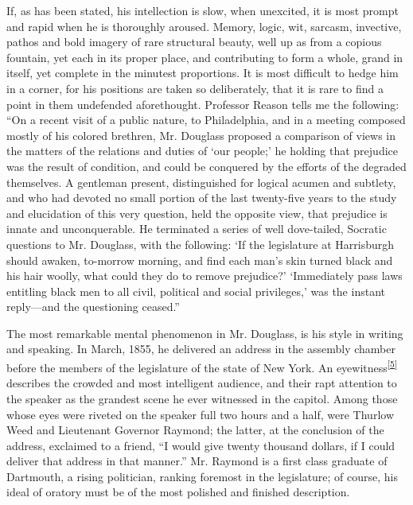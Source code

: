 If, as has been stated, his intellection is slow, when unexcited, it is
most prompt and rapid when he is thoroughly aroused. Memory, logic, wit,
sarcasm, invective, pathos and bold imagery of rare structural beauty,
well up as from a copious fountain, yet each in its proper place, and
contributing to form a whole, grand in itself, yet complete in the
minutest proportions. It is most difficult to hedge him in a corner, for
his positions are taken so deliberately, that it is rare to find a point
in them undefended aforethought. Professor Reason tells me the
following: ``On a recent visit of a public nature, to Philadelphia, and
in a meeting composed mostly of his colored brethren, Mr. Douglass
proposed a comparison of views in the matters of the relations and
duties of `our people;' he holding that prejudice was the result of
condition, and could be conquered by the efforts of the degraded
themselves. A gentleman present, distinguished for logical acumen and
subtlety, and who had devoted no small portion of the last twenty-five
years to the study and elucidation of this very question, held the
opposite view, that prejudice is innate and unconquerable. He terminated
a series of well dove-tailed, Socratic questions to Mr. Douglass, with
the following: `If the legislature at Harrisburgh should awaken,
to-morrow morning, and find each man's skin turned black and his hair
woolly, what could they do to remove prejudice?' `Immediately pass laws
entitling black men to all civil, political and social privileges,' was
the instant reply---and the questioning ceased.''

The most remarkable mental phenomenon in Mr. Douglass, is his style in
writing and speaking. In March, 1855, he delivered an address in the
assembly chamber before the members of the legislature of the state of
New York. An
eyewitness\textsuperscript{\protect\hyperlink{cite_note-5}{{[}5{]}}}
describes the crowded and most intelligent audience, and their rapt
attention to the speaker {\protect\hypertarget{xxix}{}{}}as the grandest
scene he ever witnessed in the capitol. Among those whose eyes were
riveted on the speaker full two hours and a half, were Thurlow Weed and
Lieutenant Governor Raymond; the latter, at the conclusion of the
address, exclaimed to a friend, ``I would give twenty thousand dollars,
if I could deliver that address in that manner.'' Mr. Raymond is a first
class graduate of Dartmouth, a rising politician, ranking foremost in
the legislature; of course, his ideal of oratory must be of the most
polished and finished description.

